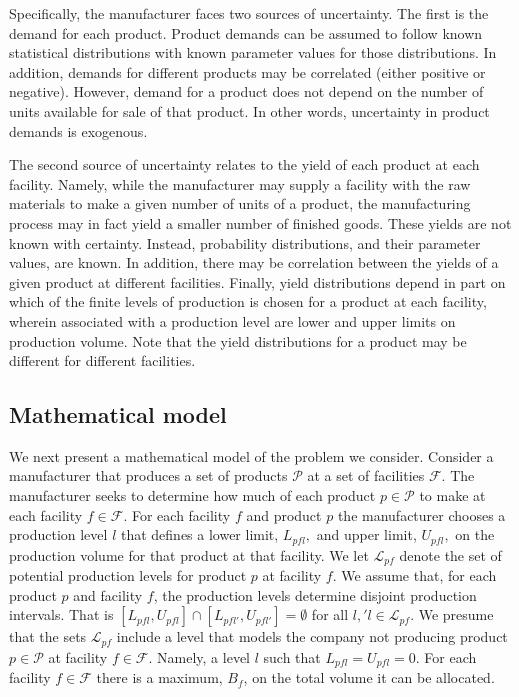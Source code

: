 \documentclass[12pt]{article}
\theoremstyle{thmstylethree}%
\begin{document}
Specifically, the manufacturer faces two sources of uncertainty. The first is the demand for each product. Product demands can be assumed to follow known statistical distributions with known parameter values for those distributions. In addition, demands for different products may be correlated (either positive or negative). However, demand for a product does not depend on the number of units available for sale of that product. In other words, uncertainty in product demands is exogenous. 

The second source of uncertainty relates to the yield of each product at each facility. Namely, while the manufacturer may supply a facility with the raw materials to make a given number of units of a product, the manufacturing process may in fact yield a smaller number of finished goods. These yields are not known with certainty. Instead, probability distributions, and their parameter values, are known. In addition, there may be correlation between the yields of a given product at different facilities.  Finally, yield distributions depend in part on which of the finite levels of production is chosen for a product at each facility, wherein associated with a production level are lower and upper limits on production volume. Note that the yield distributions for a product may be different for different facilities. 

\subsection{Mathematical model}
\label{subsec:model}
We next present a mathematical model of the problem we consider.
Consider a manufacturer that produces a set of products $\mathcal{P}$ at a set of facilities $\mathcal{F}$.
The manufacturer seeks to determine how much of each product $p \in \mathcal{P}$ to make at each facility $f \in \mathcal{F}$.
For each facility $f$ and product $p$ the manufacturer chooses a production level $l$ that defines a lower limit,
$L_{pfl},$ and upper limit, $U_{pfl},$ on the production volume for that product at that facility.
We let $\mathcal{L}_{pf}$ denote the set of potential production levels for product $p$ at facility $f$.
We assume that, for each product $p$ and facility $f$, the production levels determine disjoint production intervals.
That is $[L_{pfl},U_{pfl}]\cap [L_{pfl'},U_{pfl'}]=\emptyset$ for all $l,'l\in\mathcal{L}_{pf}$. 
We presume that the sets $\mathcal{L}_{pf}$ include a level that models  the company not producing product $p \in \mathcal{P}$ at facility $f \in \mathcal{F}$. Namely, a level $l$ such that $L_{pfl}=U_{pfl}=0$. For each facility $f \in \mathcal{F}$ there is a maximum, $B_{f}$, on the total volume it can be allocated. 
\end{document}
